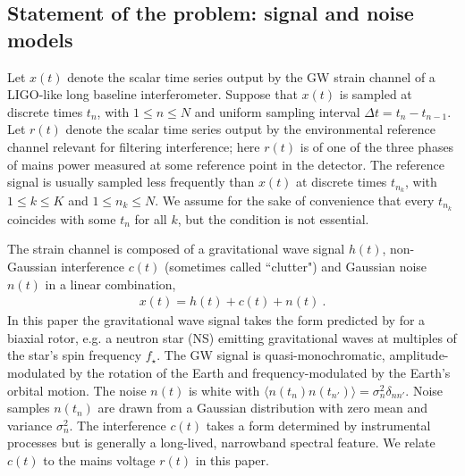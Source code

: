 \documentclass[pra,superscriptaddress,reprint,amsmath,amssymb,nofootinbib]{revtex4-2}
\begin{document}
\subsection{Statement of the problem: signal and noise models}  \label{sec21}
Let $x(t)$ denote the scalar time series output by the GW strain channel of a LIGO-like long baseline interferometer. Suppose that $x(t)$ is sampled at discrete times $t_n$, with $1 \leq n \leq N$ and uniform sampling interval $\Delta t = t_n - t_{n-1}$. Let $r(t)$ denote the scalar time series output by the environmental reference channel relevant for filtering interference; here $r(t)$ is of one of the three phases of mains power measured at some reference point in the detector. The reference signal is usually sampled less frequently than $x(t)$ at discrete times $t_{n_k}$, with $1 \leq k \leq K$ and $1 \leq n_k \leq N$. We assume for the sake of convenience that every $t_{n_k}$ coincides with some $t_n$ for all $k$, but the condition is not essential. \newline 

The strain channel is composed of a gravitational wave signal $h(t)$, non-Gaussian interference $c(t)$ (sometimes called ``clutter") and Gaussian noise $n(t)$ in a linear combination,
\begin{eqnarray}
	x(t) = h(t) + c(t) + n(t) \ .
	\label{eq:data}
\end{eqnarray}
 In this paper the gravitational wave signal takes the form predicted by \citet{Jaranowski1998} for a biaxial rotor, e.g. a neutron star (NS) emitting gravitational waves at multiples of the star's spin frequency $f_{\star}$. The GW signal is quasi-monochromatic, amplitude-modulated by the rotation of the Earth and frequency-modulated by the Earth's orbital motion. The noise $n(t)$ is white with $\langle n(t_n) n(t_{n'})\rangle = \sigma_n^2 \delta_{n n'}$. Noise samples $n(t_n)$ are drawn from a Gaussian distribution with zero mean and variance $\sigma_n^2$. The interference $c(t)$ takes a form determined by instrumental processes but is generally a long-lived, narrowband spectral feature. We relate $c(t)$ to the mains voltage $r(t)$ in this paper. \newline 
 
\end{document}
